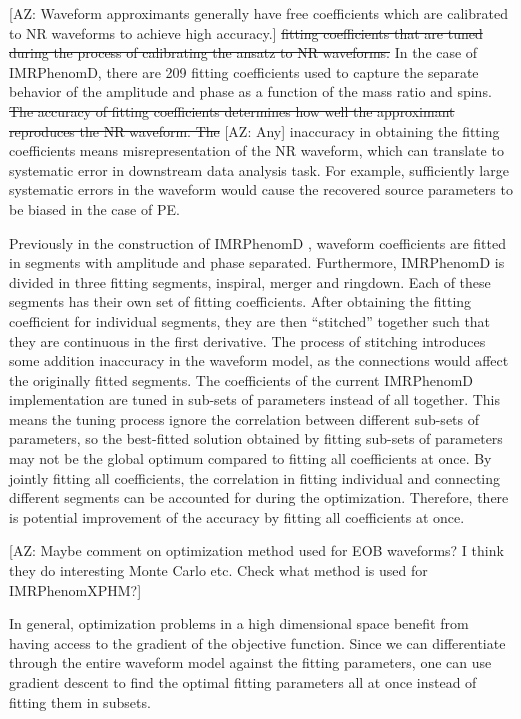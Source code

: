 \documentclass[twocolumn]{aastex631}
\newcommand{\AZ}[1]{{\color{Burnt}[AZ: #1]}}
\begin{document}
\AZ{Waveform approximants generally have free coefficients which are calibrated
to NR waveforms to achieve high accuracy.}
\sout{ fitting coefficients that are tuned during
the process of calibrating the ansatz to NR waveforms.} In the case of
IMRPhenomD, there are 209 fitting coefficients used to capture the separate
behavior of the amplitude and phase as a function of the mass ratio and spins.
\sout{The accuracy of fitting coefficients determines how well the approximant
reproduces the NR waveform. 
The}
\AZ{Any} inaccuracy in obtaining the fitting coefficients
means misrepresentation of the NR waveform, which can translate to systematic
error in downstream data analysis task. For example, sufficiently large
systematic errors in the waveform would cause the recovered source parameters to be biased
in the case of PE.

Previously in the construction of IMRPhenomD \citep{Khan:2015jqa}, waveform
coefficients are fitted in segments with amplitude and phase separated.
Furthermore, IMRPhenomD is divided in three fitting segments, inspiral, merger and ringdown.
Each of these segments has their own set of fitting coefficients.
After obtaining the fitting coefficient for individual segments, they are then
``stitched'' together such that they are continuous in the first derivative.
The process of stitching introduces some addition
inaccuracy in the waveform model, as the connections would affect the originally
fitted segments.
The coefficients of the current IMRPhenomD implementation are tuned in sub-sets
of parameters instead of all together. This means the tuning process ignore the
correlation between different sub-sets of parameters, so the best-fitted
solution obtained by fitting sub-sets of parameters may not be the global
optimum compared to fitting all coefficients at once. By jointly
fitting all coefficients, the correlation in fitting individual and connecting
different segments can be accounted for during the optimization. Therefore, there is
potential improvement of the accuracy by fitting all coefficients at once.

\AZ{Maybe comment on optimization method used for EOB waveforms?
I think they do interesting Monte Carlo etc. Check what method is used 
for IMRPhenomXPHM?}

In general, optimization problems in a high dimensional space benefit from
having access to the gradient of the objective function. Since we can
differentiate through the entire waveform model against the fitting parameters,
one can use gradient descent to find the optimal fitting parameters all at once
instead of fitting them in subsets.
\end{document}
